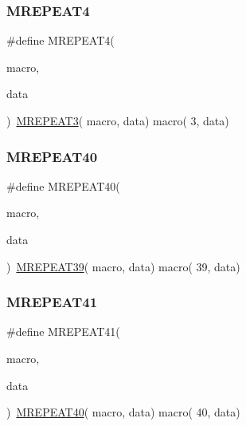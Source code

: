 \mbox{\label{group__group__sam0__utils__mrepeat_gaf5ec86cd52c8433725c3b7d756c70a49}} 
\subsubsection{\texorpdfstring{MREPEAT4}{MREPEAT4}}
{\footnotesize\ttfamily \#define M\+R\+E\+P\+E\+A\+T4(\begin{DoxyParamCaption}\item[{}]{macro,  }\item[{}]{data }\end{DoxyParamCaption})~\mbox{\hyperlink{group__group__sam0__utils__mrepeat_ga94781fc45639d838e3f23e352aa3dc63}{M\+R\+E\+P\+E\+A\+T3}}(  macro, data)   macro(  3, data)}

\mbox{\label{group__group__sam0__utils__mrepeat_ga38c6ce54b5de528a63b8cb4298e57493}} 
\subsubsection{\texorpdfstring{MREPEAT40}{MREPEAT40}}
{\footnotesize\ttfamily \#define M\+R\+E\+P\+E\+A\+T40(\begin{DoxyParamCaption}\item[{}]{macro,  }\item[{}]{data }\end{DoxyParamCaption})~\mbox{\hyperlink{group__group__sam0__utils__mrepeat_ga8940da677b29febf21ca13b7c42d97a2}{M\+R\+E\+P\+E\+A\+T39}}( macro, data)   macro( 39, data)}

\mbox{\label{group__group__sam0__utils__mrepeat_ga1c029ee082fe728ca07ac8fb71fbe4d9}} 
\subsubsection{\texorpdfstring{MREPEAT41}{MREPEAT41}}
{\footnotesize\ttfamily \#define M\+R\+E\+P\+E\+A\+T41(\begin{DoxyParamCaption}\item[{}]{macro,  }\item[{}]{data }\end{DoxyParamCaption})~\mbox{\hyperlink{group__group__sam0__utils__mrepeat_ga38c6ce54b5de528a63b8cb4298e57493}{M\+R\+E\+P\+E\+A\+T40}}( macro, data)   macro( 40, data)}

